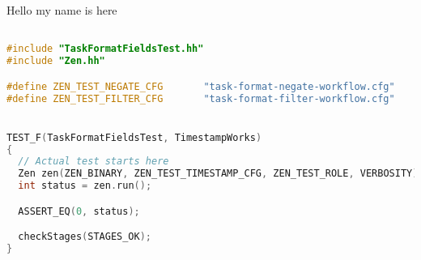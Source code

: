 Hello my name is here \cite{ConcreteMath}


\begin{lstlisting}[language=C++]

#include "TaskFormatFieldsTest.hh"
#include "Zen.hh"

#define ZEN_TEST_NEGATE_CFG       "task-format-negate-workflow.cfg"
#define ZEN_TEST_FILTER_CFG       "task-format-filter-workflow.cfg"


TEST_F(TaskFormatFieldsTest, TimestampWorks)
{
  // Actual test starts here
  Zen zen(ZEN_BINARY, ZEN_TEST_TIMESTAMP_CFG, ZEN_TEST_ROLE, VERBOSITY);
  int status = zen.run();

  ASSERT_EQ(0, status);

  checkStages(STAGES_OK);
}
\end{lstlisting}
